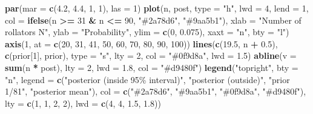 \documentclass[
]{book}
\newenvironment{Shaded}{\begin{snugshade}}{\end{snugshade}}
\newcommand{\AttributeTok}[1]{\textcolor[rgb]{0.13,0.29,0.53}{#1}}
\newcommand{\DecValTok}[1]{\textcolor[rgb]{0.00,0.00,0.81}{#1}}
\newcommand{\FloatTok}[1]{\textcolor[rgb]{0.00,0.00,0.81}{#1}}
\newcommand{\FunctionTok}[1]{\textcolor[rgb]{0.13,0.29,0.53}{\textbf{#1}}}
\newcommand{\NormalTok}[1]{#1}
\newcommand{\SpecialCharTok}[1]{\textcolor[rgb]{0.81,0.36,0.00}{\textbf{#1}}}
\newcommand{\StringTok}[1]{\textcolor[rgb]{0.31,0.60,0.02}{#1}}
\begin{document}
\begin{Shaded}
\begin{Highlighting}[]
\FunctionTok{par}\NormalTok{(}\AttributeTok{mar =} \FunctionTok{c}\NormalTok{(}\FloatTok{4.2}\NormalTok{, }\FloatTok{4.4}\NormalTok{, }\DecValTok{1}\NormalTok{, }\DecValTok{1}\NormalTok{), }\AttributeTok{las =} \DecValTok{1}\NormalTok{)}
\FunctionTok{plot}\NormalTok{(n, post, }\AttributeTok{type =} \StringTok{"h"}\NormalTok{, }\AttributeTok{lwd =} \DecValTok{4}\NormalTok{, }\AttributeTok{lend =} \DecValTok{1}\NormalTok{,}
     \AttributeTok{col =} \FunctionTok{ifelse}\NormalTok{(n }\SpecialCharTok{\textgreater{}=} \DecValTok{31} \SpecialCharTok{\&}\NormalTok{ n }\SpecialCharTok{\textless{}=} \DecValTok{90}\NormalTok{, }\StringTok{"\#2a78d6"}\NormalTok{, }\StringTok{"\#9aa5b1"}\NormalTok{),}
     \AttributeTok{xlab =} \StringTok{"Number of rollators N"}\NormalTok{, }\AttributeTok{ylab =} \StringTok{"Probability"}\NormalTok{,}
     \AttributeTok{ylim =} \FunctionTok{c}\NormalTok{(}\DecValTok{0}\NormalTok{, }\FloatTok{0.075}\NormalTok{), }\AttributeTok{xaxt =} \StringTok{"n"}\NormalTok{, }\AttributeTok{bty =} \StringTok{"l"}\NormalTok{)}
\FunctionTok{axis}\NormalTok{(}\DecValTok{1}\NormalTok{, }\AttributeTok{at =} \FunctionTok{c}\NormalTok{(}\DecValTok{20}\NormalTok{, }\DecValTok{31}\NormalTok{, }\DecValTok{41}\NormalTok{, }\DecValTok{50}\NormalTok{, }\DecValTok{60}\NormalTok{, }\DecValTok{70}\NormalTok{, }\DecValTok{80}\NormalTok{, }\DecValTok{90}\NormalTok{, }\DecValTok{100}\NormalTok{))}
\FunctionTok{lines}\NormalTok{(}\FunctionTok{c}\NormalTok{(}\FloatTok{19.5}\NormalTok{, n }\SpecialCharTok{+} \FloatTok{0.5}\NormalTok{), }\FunctionTok{c}\NormalTok{(prior[}\DecValTok{1}\NormalTok{], prior), }\AttributeTok{type =} \StringTok{"s"}\NormalTok{, }\AttributeTok{lty =} \DecValTok{2}\NormalTok{, }\AttributeTok{col =} \StringTok{"\#0f9d8a"}\NormalTok{, }\AttributeTok{lwd =} \FloatTok{1.5}\NormalTok{)}
\FunctionTok{abline}\NormalTok{(}\AttributeTok{v =} \FunctionTok{sum}\NormalTok{(n }\SpecialCharTok{*}\NormalTok{ post), }\AttributeTok{lty =} \DecValTok{2}\NormalTok{, }\AttributeTok{lwd =} \FloatTok{1.8}\NormalTok{, }\AttributeTok{col =} \StringTok{"\#d9480f"}\NormalTok{)}
\FunctionTok{legend}\NormalTok{(}\StringTok{"topright"}\NormalTok{, }\AttributeTok{bty =} \StringTok{"n"}\NormalTok{,}
       \AttributeTok{legend =} \FunctionTok{c}\NormalTok{(}\StringTok{"posterior (inside 95\% interval)"}\NormalTok{, }\StringTok{"posterior (outside)"}\NormalTok{,}
                  \StringTok{"prior 1/81"}\NormalTok{, }\StringTok{"posterior mean"}\NormalTok{),}
       \AttributeTok{col =} \FunctionTok{c}\NormalTok{(}\StringTok{"\#2a78d6"}\NormalTok{, }\StringTok{"\#9aa5b1"}\NormalTok{, }\StringTok{"\#0f9d8a"}\NormalTok{, }\StringTok{"\#d9480f"}\NormalTok{),}
       \AttributeTok{lty =} \FunctionTok{c}\NormalTok{(}\DecValTok{1}\NormalTok{, }\DecValTok{1}\NormalTok{, }\DecValTok{2}\NormalTok{, }\DecValTok{2}\NormalTok{), }\AttributeTok{lwd =} \FunctionTok{c}\NormalTok{(}\DecValTok{4}\NormalTok{, }\DecValTok{4}\NormalTok{, }\FloatTok{1.5}\NormalTok{, }\FloatTok{1.8}\NormalTok{))}
\end{Highlighting}
\end{Shaded}
\end{document}
